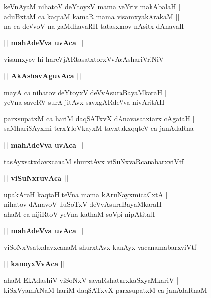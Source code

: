 \documentclass[twoside,12pt,openright]{book}
\newcounter{shloka}[chapter]
\def\uvaca#1{\centerline{{\large\textbf{#1}}}}
\begin{document}
\begin{shloka}%
keVnAyaM nihatoV deYtoyxV mama veYriv mahAbalaH |\\
aduBxtaM ca kaqtaM kamaR mama visamxyakArakaM ||\\
na ca deVvoV na gaMdhavaRH tatasxmov nAsitx dAnavaH 
\end{shloka}

\uvaca{|| mahAdeVva uvAca ||}

\begin{shloka}%
visamxyov hi hareVjARtasatxtorxVvAcAshariVriNiV
\end{shloka}

\uvaca{|| AkAshavAguvAca ||}

\begin{shloka}%
mayA ca nihatov deYtoyxV deVvAsuraBayaMkaraH |\\
yeVna saveRV surA jitAvx savxgARdeVva nivAritAH
\end{shloka}

\begin{shloka}%
parxsupatxM ca hariM daqSATxvX dAnavasatxtarx cAgataH |\\
saMhariSAyxmi terxYloVkayxM tavxtakxqqteV ca janAdaRna
\end{shloka}

\uvaca{|| mahAdeVva uvAca ||}

\begin{shloka}%
tasAyxsatxdavxcanaM shurxtAvx viSuNxvaRcanabarxviVtf
\end{shloka}

\uvaca{|| viSuNxruvAca ||}

\begin{shloka}%
upakAraH kaqtaH teVna mama kAruNayxmicaCxtA |\\
nihatov dAnavoV duSoTxV deVvAsuraBayaMkaraH |\\
ahaM ca nijiRtoV yeVna kathaM soVpi nipAtitaH
\end{shloka}

\uvaca{|| mahAdeVva uvAca ||}

\begin{shloka}%
viSoNxVsatxdavxcanaM shurxtAvx kanAyx vacanamabarxviVtf
\end{shloka}

\uvaca{|| kanoyxVvAca ||}

\begin{shloka}%
ahaM EkAdashiV viSoNxV savaRshaturxkaSxyaMkariV |\\
kiSxVyamANaM hariM daqSATxvX parxsupatxM ca janAdaRnaM 
\end{shloka}
\end{document}
